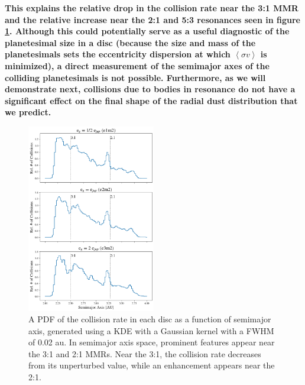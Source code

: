 \documentclass[fleqn,usenatbib]{mnras}
\begin{document}
\textbf{ This explains the relative drop in the collision rate
near the 3:1 MMR and the relative increase near the 2:1 and 5:3
resonances \textbf{seen in figure \ref{fig:coll_hist_a}}. Although this could potentially serve as a useful
diagnostic of the planetesimal size in a disc (\textbf{because the size and mass of the planetesimals sets the eccentricity dispersion at which $\left< \sigma v \right>$ is minimized}), a direct measurement of the
semimajor axes of the colliding planetesimals is not
possible. Furthermore, as we will demonstrate next, collisions due to bodies in resonance do not have a significant effect on the final shape of the radial dust distribution that we predict.}

\begin{figure}
\begin{center}
    \includegraphics[width=0.5\textwidth]{figures/coll_hist_a.png}
    \caption{A PDF of the collision rate in each disc as a function of semimajor axis, generated using a KDE with a Gaussian kernel with a FWHM of 0.02 au. In semimajor axis space, prominent features appear near the 3:1 and 2:1 MMRs. Near the 3:1, the collision rate decreases from its unperturbed value, while an enhancement appears near the 2:1.\label{fig:coll_hist_a}}
\end{center}
\end{figure}
\end{document}
